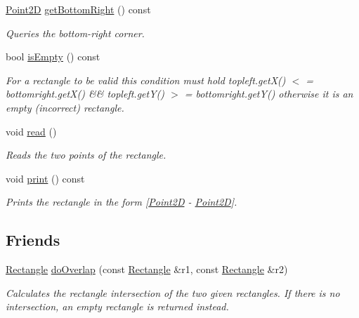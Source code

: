 \begin{DoxyCompactItemize}
\hyperlink{classPoint2D}{Point2D} \hyperlink{classRectangle_a5f30a92f3fc197dda50d9e59995d3ac1}{get\+Bottom\+Right} () const
\begin{DoxyCompactList}\small\item\em Queries the bottom-\/right corner. \end{DoxyCompactList}\item 
bool \hyperlink{classRectangle_af732bce8c96d2469994825e9a87dbe5f}{is\+Empty} () const
\begin{DoxyCompactList}\small\item\em For a rectangle to be valid this condition must hold topleft.\+get\+X() $<$ = bottomright.\+get\+X() \&\& topleft.\+get\+Y() $>$ = bottomright.\+get\+Y() otherwise it is an empty (incorrect) rectangle. \end{DoxyCompactList}\item 
\mbox{\label{classRectangle_af6973ed3094f9dbabeadb071772fa76d}} 
void \hyperlink{classRectangle_af6973ed3094f9dbabeadb071772fa76d}{read} ()
\begin{DoxyCompactList}\small\item\em Reads the two points of the rectangle. \end{DoxyCompactList}\item 
\mbox{\label{classRectangle_a4e315c59754599c74e99e8b31f7031a0}} 
void \hyperlink{classRectangle_a4e315c59754599c74e99e8b31f7031a0}{print} () const
\begin{DoxyCompactList}\small\item\em Prints the rectangle in the form \mbox{[}\hyperlink{classPoint2D}{Point2D} -\/ \hyperlink{classPoint2D}{Point2D}\mbox{]}. \end{DoxyCompactList}\end{DoxyCompactItemize}
\subsection*{Friends}
\begin{DoxyCompactItemize}
\item 
\hyperlink{classRectangle}{Rectangle} \hyperlink{classRectangle_a888d2b0113947b4461107bb02b28799d}{do\+Overlap} (const \hyperlink{classRectangle}{Rectangle} \&r1, const \hyperlink{classRectangle}{Rectangle} \&r2)
\begin{DoxyCompactList}\small\item\em Calculates the rectangle intersection of the two given rectangles. If there is no intersection, an empty rectangle is returned instead. \end{DoxyCompactList}\end{DoxyCompactItemize}


